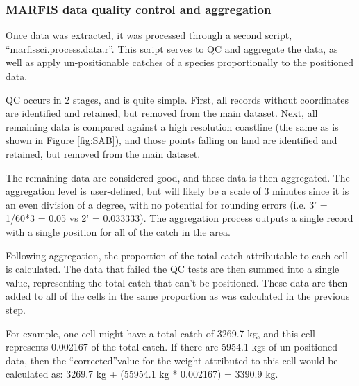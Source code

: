 \documentclass[letterpaper,portrait,11pt]{scrartcl}
\numberwithin{equation}{section}		%
\numberwithin{figure}{section}		%
\numberwithin{table}{section}				%
\begin{document}


\subsubsection{MARFIS data quality control and aggregation}
Once data was extracted, it was processed through a second script, \textquotedblleft marfissci.process.data.r\textquotedblright.  This script serves to QC and aggregate the data, as well as apply un-positionable catches of a species proportionally to the positioned data.

QC occurs in 2 stages, and is quite simple.  First, all records without coordinates are identified and retained, but removed from the main dataset.  Next, all remaining data is compared against a high resolution coastline (the same as is shown in Figure \ref{fig:SAB}), and those points falling on land are identified and retained, but removed from the main dataset.

The remaining data are considered good, and these data is then aggregated.  The aggregation level is user-defined, but will likely be a scale of 3 minutes since it is an even division of a degree, with no potential for rounding errors (i.e. 3' = 1/60*3 = 0.05 vs 2' = 0.033333).  The aggregation process outputs a single record with a single position for all of the catch in the area.

Following aggregation, the proportion of the total catch attributable to each cell is calculated.  The data that failed the QC tests are then summed into a single value, representing the total catch that can\textquoteright t be positioned.  These data are then added to all of the cells in the same proportion as was calculated in the previous step.

For example, one cell might have a total catch of 3269.7 kg, and this cell represents 0.002167 of the total catch.  If there are 5954.1 kgs of un-positioned data, then the \textquotedblleft corrected\textquotedblright value for the weight attributed to this cell would be calculated as:
3269.7 kg + (55954.1 kg * 0.002167) = 3390.9 kg.
\end{document}
